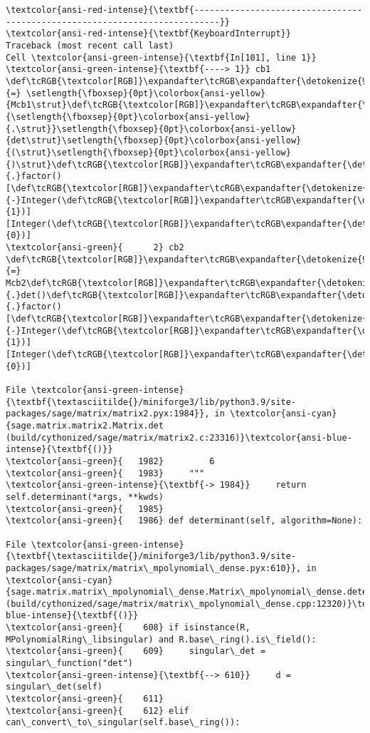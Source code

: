 \documentclass[11pt]{article}
\begin{document}
    \begin{Verbatim}[commandchars=\\\{\}, frame=single, framerule=2mm, rulecolor=\color{outerrorbackground}]
\textcolor{ansi-red-intense}{\textbf{---------------------------------------------------------------------------}}
\textcolor{ansi-red-intense}{\textbf{KeyboardInterrupt}}                         Traceback (most recent call last)
Cell \textcolor{ansi-green-intense}{\textbf{In[101], line 1}}
\textcolor{ansi-green-intense}{\textbf{----> 1}} cb1 \def\tcRGB{\textcolor[RGB]}\expandafter\tcRGB\expandafter{\detokenize{98,98,98}}{=} \setlength{\fboxsep}{0pt}\colorbox{ansi-yellow}{Mcb1\strut}\def\tcRGB{\textcolor[RGB]}\expandafter\tcRGB\expandafter{\detokenize{98,98,98}}{\setlength{\fboxsep}{0pt}\colorbox{ansi-yellow}{.\strut}}\setlength{\fboxsep}{0pt}\colorbox{ansi-yellow}{det\strut}\setlength{\fboxsep}{0pt}\colorbox{ansi-yellow}{(\strut}\setlength{\fboxsep}{0pt}\colorbox{ansi-yellow}{)\strut}\def\tcRGB{\textcolor[RGB]}\expandafter\tcRGB\expandafter{\detokenize{98,98,98}}{.}factor()[\def\tcRGB{\textcolor[RGB]}\expandafter\tcRGB\expandafter{\detokenize{98,98,98}}{-}Integer(\def\tcRGB{\textcolor[RGB]}\expandafter\tcRGB\expandafter{\detokenize{98,98,98}}{1})][Integer(\def\tcRGB{\textcolor[RGB]}\expandafter\tcRGB\expandafter{\detokenize{98,98,98}}{0})]
\textcolor{ansi-green}{      2} cb2 \def\tcRGB{\textcolor[RGB]}\expandafter\tcRGB\expandafter{\detokenize{98,98,98}}{=} Mcb2\def\tcRGB{\textcolor[RGB]}\expandafter\tcRGB\expandafter{\detokenize{98,98,98}}{.}det()\def\tcRGB{\textcolor[RGB]}\expandafter\tcRGB\expandafter{\detokenize{98,98,98}}{.}factor()[\def\tcRGB{\textcolor[RGB]}\expandafter\tcRGB\expandafter{\detokenize{98,98,98}}{-}Integer(\def\tcRGB{\textcolor[RGB]}\expandafter\tcRGB\expandafter{\detokenize{98,98,98}}{1})][Integer(\def\tcRGB{\textcolor[RGB]}\expandafter\tcRGB\expandafter{\detokenize{98,98,98}}{0})]

File \textcolor{ansi-green-intense}{\textbf{\textasciitilde{}/miniforge3/lib/python3.9/site-packages/sage/matrix/matrix2.pyx:1984}}, in \textcolor{ansi-cyan}{sage.matrix.matrix2.Matrix.det (build/cythonized/sage/matrix/matrix2.c:23316)}\textcolor{ansi-blue-intense}{\textbf{()}}
\textcolor{ansi-green}{   1982}         6
\textcolor{ansi-green}{   1983}     """
\textcolor{ansi-green-intense}{\textbf{-> 1984}}     return self.determinant(*args, **kwds)
\textcolor{ansi-green}{   1985} 
\textcolor{ansi-green}{   1986} def determinant(self, algorithm=None):

File \textcolor{ansi-green-intense}{\textbf{\textasciitilde{}/miniforge3/lib/python3.9/site-packages/sage/matrix/matrix\_mpolynomial\_dense.pyx:610}}, in \textcolor{ansi-cyan}{sage.matrix.matrix\_mpolynomial\_dense.Matrix\_mpolynomial\_dense.determinant (build/cythonized/sage/matrix/matrix\_mpolynomial\_dense.cpp:12320)}\textcolor{ansi-blue-intense}{\textbf{()}}
\textcolor{ansi-green}{    608} if isinstance(R, MPolynomialRing\_libsingular) and R.base\_ring().is\_field():
\textcolor{ansi-green}{    609}     singular\_det = singular\_function("det")
\textcolor{ansi-green-intense}{\textbf{--> 610}}     d = singular\_det(self)
\textcolor{ansi-green}{    611} 
\textcolor{ansi-green}{    612} elif can\_convert\_to\_singular(self.base\_ring()):


\end{Verbatim}
\end{document}

